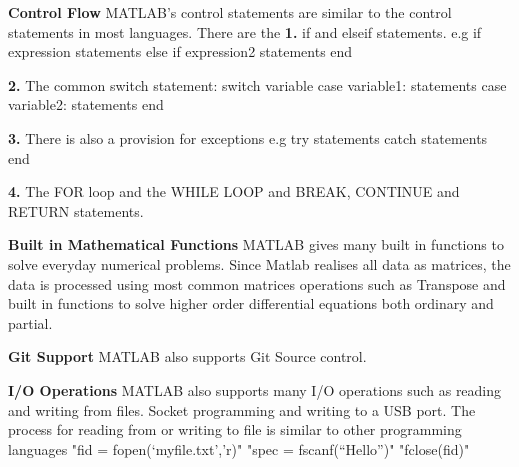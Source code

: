 \documentclass[fleqn,letterpaper,12pt]{report}
\begin{document}
\textbf{Control Flow}\newline
MATLAB’s control statements are similar to the control statements in most languages. There are the \newline
\textbf{1.} if and elseif statements.\newline
e.g\newline
if expression\newline
	statements\newline
else if expression2\newline
	statements\newline
end

\textbf{2.} The common switch statement:
switch variable\newline
case variable1:\newline
	statements\newline
case variable2:\newline
	statements\newline
end

\textbf{3.} There is also a provision for exceptions
e.g\newline
try \newline
	statements\newline
catch\newline
	statements\newline
end

\textbf{4.} The FOR loop and the WHILE LOOP and BREAK, CONTINUE and RETURN statements.

\textbf{Built in Mathematical Functions}\newline
MATLAB gives many built in functions to solve everyday numerical problems. Since Matlab realises all data as matrices, the data is processed using most common matrices operations such as Transpose and built in functions to solve higher order differential equations both ordinary and partial.

\textbf{Git Support}\newline
MATLAB also supports Git Source control. 

\textbf{I/O Operations}\newline
MATLAB also supports many I/O operations such as reading and writing from files. Socket programming and writing to a USB port.
The process for reading from or writing to  file is similar to other programming languages
"fid = fopen(‘myfile.txt’,’r)" %
"spec = fscanf(“Hello”)" %
"fclose(fid)" %
\end{document}
